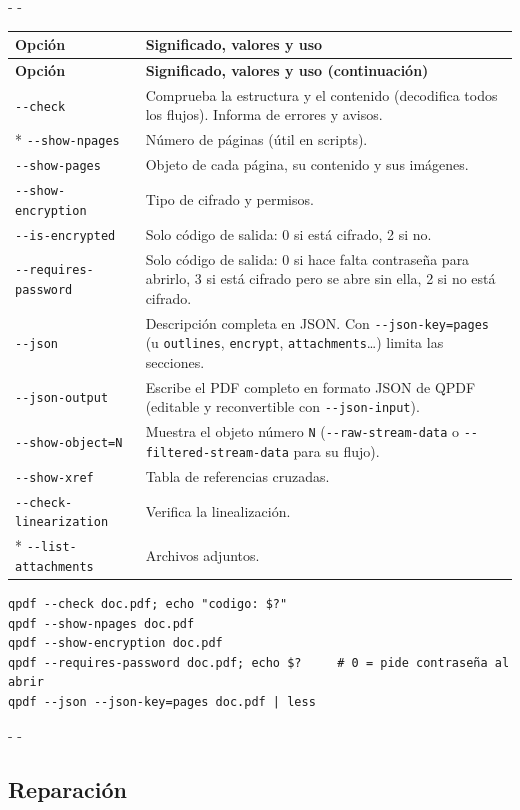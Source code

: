 \documentclass[11pt,a4paper]{article}
\makeatletter
\newcommand{\necesitaespacio}[1]{\par\penalty-100\begingroup
	\setlength{\dimen@}{#1}\dimen@ii\pagegoal\advance\dimen@ii-\pagetotal
	\ifdim\dimen@>\dimen@ii\ifdim\dimen@ii>\z@\vfil\fi\penalty-\@M\fi\endgroup}
\newenvironment{opciones}[1][Opción]{%
	\par\begingroup\small
	\begin{longtable}{L{4.25cm}L{11.2cm}}
		\toprule\rowcolor{tablacab}\cab{#1} & \cab{Significado, valores y uso} \\ \midrule
		\endfirsthead
		\toprule\rowcolor{tablacab}\cab{#1} & \cab{Significado, valores y uso (continuación)} \\ \midrule
		\endhead
		\bottomrule
		\endfoot}
	{\end{longtable}\endgroup}
\newcommand{\opt}[1]{\texttt{\textcolor{colopt}{#1}}}      %
\newcommand{\val}[1]{\texttt{#1}}                          %
\newcommand{\cab}[1]{\textbf{#1}}
\makeatother
\begin{document}
	\necesitaespacio{28\baselineskip}
	\begin{opciones}
		\opt{-{}-check} & Comprueba la estructura y el contenido (decodifica todos los flujos). Informa de errores y avisos.\\*
		\opt{-{}-show-npages} & Número de páginas (útil en scripts).\\
		\opt{-{}-show-pages} & Objeto de cada página, su contenido y sus imágenes.\\
		\opt{-{}-show-\allowbreak{}encryption} & Tipo de cifrado y permisos.\\
		\opt{-{}-is-encrypted} & Solo código de salida: 0 si está cifrado, 2 si no.\\
		\opt{-{}-requires-\allowbreak{}password} & Solo código de salida: 0 si hace falta contraseña para abrirlo, 3 si está cifrado pero se abre sin ella, 2 si no está cifrado.\\
		\opt{-{}-json} & Descripción completa en JSON. Con \opt{-{}-json-\allowbreak{}key=\allowbreak{}pages} (u \val{outlines}, \val{encrypt}, \val{attachments}\ldots) limita las secciones.\\
		\opt{-{}-json-output} & Escribe el PDF completo en formato JSON de QPDF (editable y reconvertible con \opt{-{}-json-input}).\\
		\opt{-{}-show-\allowbreak{}object=\allowbreak{}N} & Muestra el objeto número \val{N} (\opt{-{}-raw-\allowbreak{}stream-\allowbreak{}data} o \opt{-{}-filtered-\allowbreak{}stream-\allowbreak{}data} para su flujo).\\
		\opt{-{}-show-xref} & Tabla de referencias cruzadas.\\
		\opt{-{}-check-\allowbreak{}linearization} & Verifica la linealización.\\*
		\opt{-{}-list-\allowbreak{}attachments} & Archivos adjuntos.\\
	\end{opciones}
	
	\begin{lstlisting}
qpdf --check doc.pdf; echo "codigo: $?"
qpdf --show-npages doc.pdf
qpdf --show-encryption doc.pdf
qpdf --requires-password doc.pdf; echo $?     # 0 = pide contraseña al abrir
qpdf --json --json-key=pages doc.pdf | less
\end{lstlisting}
	
	\necesitaespacio{8\baselineskip}
	\subsection{Reparación}
	
\end{document}
